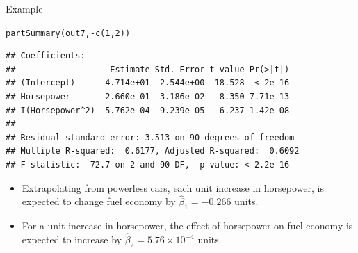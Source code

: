 \documentclass{beamer}\usepackage[]{graphicx}\usepackage[]{color}
\makeatletter
\newcommand{\hlnum}[1]{\textcolor[rgb]{0.69,0.494,0}{#1}}%
\newcommand{\hlopt}[1]{\textcolor[rgb]{0,0,0}{#1}}%
\newcommand{\hlstd}[1]{\textcolor[rgb]{0,0,0}{#1}}%
\newcommand{\hlkwd}[1]{\textcolor[rgb]{0.004,0.004,0.506}{#1}}%
\newenvironment{kframe}{%
 \def\at@end@of@kframe{}%
 \ifinner\ifhmode%
  \def\at@end@of@kframe{\end{minipage}}%
  \begin{minipage}{\columnwidth}%
 \fi\fi%
 \def\FrameCommand##1{\hskip\@totalleftmargin \hskip-\fboxsep
 \colorbox{shadecolor}{##1}\hskip-\fboxsep
     \hskip-\linewidth \hskip-\@totalleftmargin \hskip\columnwidth}%
 \MakeFramed {\advance\hsize-\width
   \@totalleftmargin\z@ \linewidth\hsize
   \@setminipage}}%
 {\par\unskip\endMakeFramed%
 \at@end@of@kframe}
\newenvironment{knitrout}{}{} %
\makeatother
\begin{document}

\begin{frame}[fragile]{Example}

\begin{knitrout}\footnotesize
{}\color{fgcolor}\begin{kframe}
\begin{alltt}
\hlkwd{partSummary}\hlstd{(out7,} \hlopt{-}\hlkwd{c}\hlstd{(}\hlnum{1}\hlstd{,} \hlnum{2}\hlstd{))}
\end{alltt}
\begin{verbatim}
## Coefficients:
##                   Estimate Std. Error t value Pr(>|t|)
## (Intercept)      4.714e+01  2.544e+00  18.528  < 2e-16
## Horsepower      -2.660e-01  3.186e-02  -8.350 7.71e-13
## I(Horsepower^2)  5.762e-04  9.239e-05   6.237 1.42e-08
## 
## Residual standard error: 3.513 on 90 degrees of freedom
## Multiple R-squared:  0.6177,	Adjusted R-squared:  0.6092 
## F-statistic:  72.7 on 2 and 90 DF,  p-value: < 2.2e-16
\end{verbatim}
\end{kframe}
\end{knitrout}
\begin{itemize}
\item Extrapolating from powerless cars, each unit increase in 
  horsepower, is expected to change fuel economy by $\hat{\beta}_1 = 
  -0.266$ units.
  \vc
\item For a unit increase in horsepower, the effect of horsepower on fuel 
  economy is expected to increase by $\hat{\beta}_2 = 
  \ensuremath{5.76\times 10^{-4}}$ units.
\end{itemize}

\end{frame}

\end{document}
